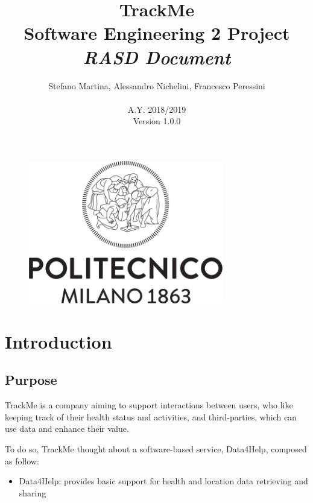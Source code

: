 \documentclass{article}
\begin{document}
\begin{figure}[t]
\centering
	\includegraphics[height=6.25cm,keepaspectratio]{Figures/logo}
\end{figure}

\title{TrackMe \\ Software Engineering 2 Project\\ \textit{RASD Document} }
\author{Stefano Martina, Alessandro Nichelini, Francesco Peressini
		\\ \\ A.Y. 2018/2019 \\ Version 1.0.0}
		
\maketitle
\newpage

\tableofcontents
\newpage

\section{Introduction}

\subsection{Purpose} 

TrackMe is a company aiming to support interactions between users, 
who like keeping track of their health status and activities, and
third-parties, which can use data and enhance their value.

To do so, TrackMe thought about a software-based service, Data4Help, 
composed as follow:

\begin{itemize}
\item Data4Help: provides basic support for health and location data retrieving and sharing 
\end{itemize}
\end{document}
